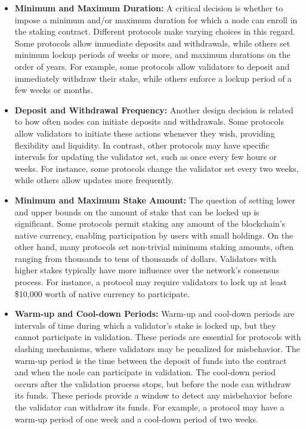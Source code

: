 \begin{itemize}
    \item \textbf{Minimum and Maximum Duration:} A critical decision is whether to impose a minimum and/or maximum duration for which a node can enroll in the staking contract. Different protocols make varying choices in this regard. Some protocols allow immediate deposits and withdrawals, while others set minimum lockup periods of weeks or more, and maximum durations on the order of years. For example, some protocols allow validators to deposit and immediately withdraw their stake, while others enforce a lockup period of a few weeks or months.
    
    \item \textbf{Deposit and Withdrawal Frequency:} Another design decision is related to how often nodes can initiate deposits and withdrawals. Some protocols allow validators to initiate these actions whenever they wish, providing flexibility and liquidity. In contrast, other protocols may have specific intervals for updating the validator set, such as once every few hours or weeks. For instance, some protocols change the validator set every two weeks, while others allow updates more frequently.
    
    \item \textbf{Minimum and Maximum Stake Amount:} The question of setting lower and upper bounds on the amount of stake that can be locked up is significant. Some protocols permit staking any amount of the blockchain's native currency, enabling participation by users with small holdings. On the other hand, many protocols set non-trivial minimum staking amounts, often ranging from thousands to tens of thousands of dollars. Validators with higher stakes typically have more influence over the network's consensus process. For instance, a protocol may require validators to lock up at least \$10,000 worth of native currency to participate.
    
    \item \textbf{Warm-up and Cool-down Periods:} Warm-up and cool-down periods are intervals of time during which a validator's stake is locked up, but they cannot participate in validation. These periods are essential for protocols with slashing mechanisms, where validators may be penalized for misbehavior. The warm-up period is the time between the deposit of funds into the contract and when the node can participate in validation. The cool-down period occurs after the validation process stops, but before the node can withdraw its funds. These periods provide a window to detect any misbehavior before the validator can withdraw its funds. For example, a protocol may have a warm-up period of one week and a cool-down period of two weeks.
    

\end{itemize}
